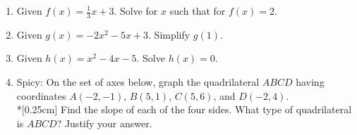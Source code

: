 \documentclass[12pt, twoside]{article}
\begin{document}
\begin{enumerate}
\item Given $f(x)=\frac{1}{3} x+3$. Solve for $x$ such that for $f(x)=2$. \vspace{5cm}
\item Given $g(x)=-2x^2-5x+3$. Simplify $g(1)$. \vspace{2cm}

\newpage
\item Given $h(x)=x^2-4x-5$. Solve $h(x)=0$. \vspace{5cm}

\item Spicy: On the set of axes below, graph the quadrilateral $ABCD$ having coordinates $A(-2,-1)$, $B(5,1)$, $C(5,6)$, and $D(-2,4)$. \\*[0.25cm]
  Find the slope of each of the four sides. What type of quadrilateral is $ABCD$? Justify your answer.
  \begin{flushright} %
  \end{flushright}

\end{enumerate}
\end{document}
